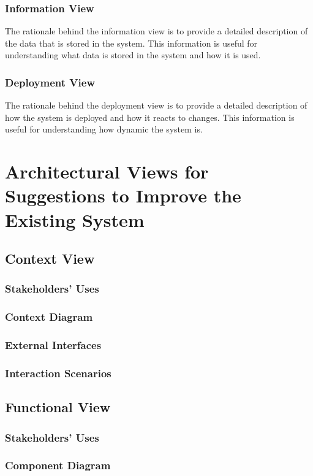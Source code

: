 \documentclass[a4paper]{article}
\begin{document}
    \subsubsection{Information View}
    The rationale behind the information view is to provide a detailed description of the data that is stored in the system.
    This information is useful for understanding what data is stored in the system and how it is used.
    \subsubsection{Deployment View}
    The rationale behind the deployment view is to provide a detailed description of how the system is deployed and how it reacts
    to changes. This information is useful for understanding how dynamic the system is.
    \section{Architectural Views for Suggestions to Improve the Existing System}
    \subsection{Context View}
    \subsubsection{Stakeholders' Uses}
    \lipsum[1-1]
    \subsubsection{Context Diagram}
    \subsubsection{External Interfaces}
    \lipsum[1-1]
    \subsubsection{Interaction Scenarios}
    \lipsum[1-1]
    \subsection{Functional View}
    \subsubsection{Stakeholders' Uses}
    \lipsum[1-1]
    \subsubsection{Component Diagram}
\end{document}
